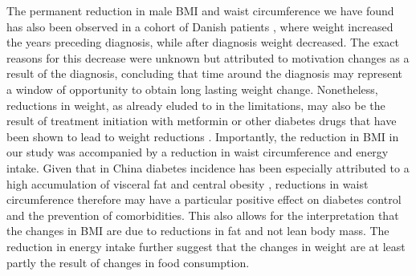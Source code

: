 The permanent reduction in male \ac{BMI} and waist circumference we have found has also been observed in a cohort of Danish patients \autocite{DeFineOlivarius2015}, where weight increased the years preceding diagnosis, while after diagnosis weight decreased. The exact reasons for this decrease were unknown but attributed to motivation changes as a result of the diagnosis, concluding that time around the diagnosis may represent a window of opportunity to obtain long lasting weight change. Nonetheless, reductions in weight, as already eluded to in the limitations, may also be the result of treatment initiation with metformin or other diabetes drugs that have been shown to lead to weight reductions \autocite{Yang2014}. Importantly, the reduction in \ac{BMI} in our study was accompanied by a reduction in waist circumference and energy intake.  Given that in China diabetes incidence has been especially attributed to a high accumulation of visceral fat and central obesity \autocite{Ma2014}, reductions in waist circumference therefore may have a particular positive effect on diabetes control and the prevention of comorbidities. This also allows for the interpretation  that the changes in \ac{BMI} are due to reductions in fat and not lean body mass\autocite{Klein2007}. The reduction in energy intake further suggest that the changes in weight are at least partly the result of changes in food consumption.

